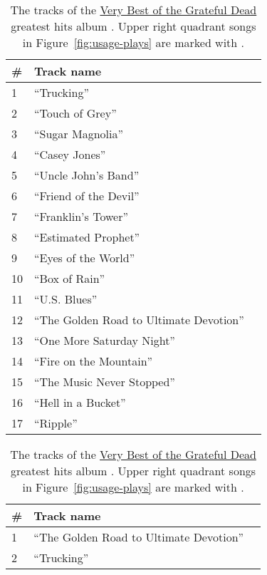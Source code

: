 \documentclass{svmult}
\newcommand{\ttt}[1]{``#1''}
\newcommand{\album}[1]{\uline{#1}}
\begin{document}
\begin{table}
    \begin{minipage}{2.75in}
    \begin{center}
\begin{footnotesize}
    \begin{tabular}{lll}
\hline
\textbf{\#}&\textbf{\hspace{0.1in}Track name}\\\hline
1&\ttt{Trucking} \\ 	 	
2&\ttt{Touch of Grey} \\
3&\ttt{Sugar Magnolia} \\
4&\ttt{Casey Jones} \\ 	
5&\ttt{Uncle John's Band} \\
6&\ttt{Friend of the Devil} \\
7&\ttt{Franklin's Tower} \\
8&\ttt{Estimated Prophet} \\	
9&\ttt{Eyes of the World} \\	
10&\ttt{Box of Rain} \\	
11&\ttt{U.S.  Blues}\\
12&\ttt{The Golden Road to Ultimate Devotion}\\
13&\ttt{One More Saturday Night} \\
14&\ttt{Fire on the Mountain} \\
15&\ttt{The Music Never Stopped}\\
16&\ttt{Hell in a Bucket}\\
17&\ttt{Ripple}\\
\hline
\end{tabular}
\caption{\label{tab:hits1}The tracks of the \album{Very Best of the Grateful Dead} greatest hits album \cite{hits:dead2003}.  Upper right quadrant songs in Figure~\ref{fig:usage-plays} are marked with .}
\end{footnotesize}
\end{center}
    \end{minipage}
    \qquad
    \begin{minipage}{2.75in}
    \begin{center}
\begin{footnotesize}
    \begin{tabular}{lll}
\hline
\textbf{\#}&\textbf{\hspace{0.1in}Track name}\\\hline
1&\ttt{The Golden Road to Ultimate Devotion}\\ 	
2&\ttt{Trucking} \\

\end{tabular}
\end{footnotesize}
\end{center}
\end{minipage}
\end{table}
\end{document}
